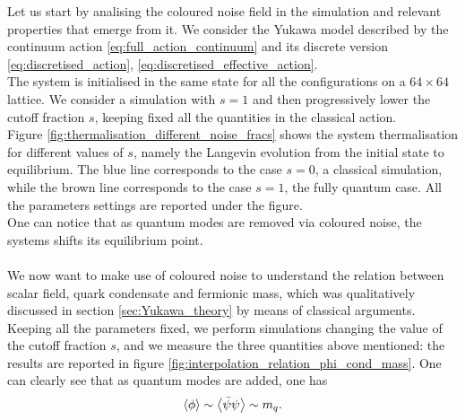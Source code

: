 Let us start by analising the coloured noise field in the simulation and relevant properties that emerge from it. We consider the Yukawa model described by the continuum action \eqref{eq:full_action_continuum} and its discrete version \eqref{eq:discretised_action}, \eqref{eq:discretised_effective_action}.\\
The system is initialised in the same state for all the configurations on a $64 \times 64$ lattice. We consider a simulation with $s=1$ and then progressively lower the cutoff fraction $s$, keeping fixed all the quantities in the classical action. \\
Figure \ref{fig:thermalisation_different_noise_fracs} shows the system thermalisation for different values of $s$, namely the Langevin evolution from the initial state to equilibrium. The blue line corresponds to the case $s=0$, a classical simulation, while the brown line corresponds to the case $s=1$, the fully quantum case.  All the parameters settings are reported under the figure. \\
One can notice that as quantum modes are removed via coloured noise, the systems shifts its equilibrium point. \\~\\ 
We now want to make use of coloured noise to understand the relation between scalar field, quark condensate and fermionic mass, which was qualitatively discussed in section \ref{sec:Yukawa_theory} by means of classical arguments. \\
Keeping all the parameters fixed, we perform simulations changing the value of the cutoff fraction $s$, and we measure the three quantities above mentioned: the results are reported in figure \ref{fig:interpolation_relation_phi_cond_mass}. 
One can clearly see that as quantum modes are added, one has
\begin{equation*}
	\left\langle \phi \right\rangle \sim \left\langle \bar\psi\psi \right\rangle \sim m_q.
\end{equation*}
